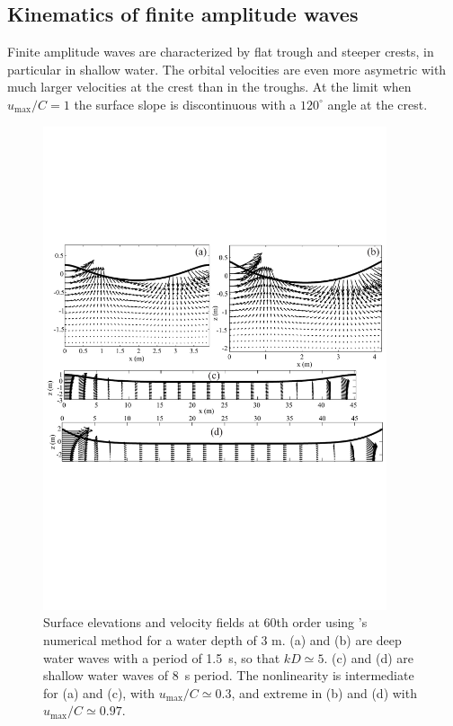 \subsection{Kinematics of finite amplitude waves}
Finite amplitude waves are characterized by flat trough and steeper crests, in particular in shallow water. The orbital 
velocities are even more asymetric with much larger velocities at the crest than in the troughs. At the limit 
when $u_{\mathrm{max}}/C = 1$ the surface slope is discontinuous with a  $120^\circ$  angle at the crest. 
\begin{figure}[htb]
\centerline{\includegraphics[width=0.9\textwidth]{FIGS_CH_NONLIN/vagues_amplitude_finie.pdf}}
\caption{Surface elevations and velocity fields at 60th order using \cite{Dalrymple1974}'s numerical method 
for a water depth of 3 m. (a) and (b) are deep water  waves with a period of 1.5~s, so that  $kD\simeq 5$.  
(c) and (d) are shallow water waves of 8~s period. The nonlinearity is intermediate for (a) and (c), with $u_{\mathrm{max}}/C\simeq 0.3$, 
and extreme in (b) and (d)  with $u_{\mathrm{max}}/C\simeq 0.97$.}
\label{Fig_amplitude_finie}
\end{figure}


